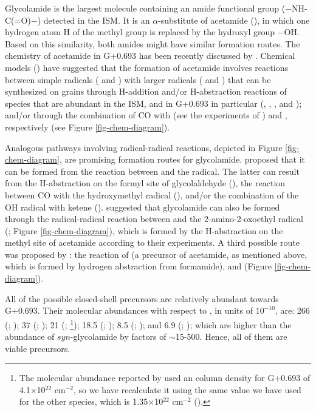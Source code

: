 \documentclass[twocolumn]{aastex63}
\begin{document}
Glycolamide is the largest molecule containing an amide functional group ($-$NH-C(=O)$-$) detected in the ISM. It is an $\alpha$-substitute of acetamide (), in which one hydrogen atom H of the methyl group is replaced by the hydroxyl group $-$OH. Based on this similarity, both amides might have similar formation routes. The chemistry of acetamide in G+0.693 has been recently discussed by \citet{zeng2023}. Chemical models (\citealt{belloche2017,belloche2019,garrod2022}) have suggested that the formation of acetamide involves reactions between simple radicals ( and ) with larger radicals ( and ) that can be synthesized on grains through H-addition and/or H-abstraction reactions of species that are abundant in the ISM, and in G+0.693 in particular (, , , and ); and/or through the combination of CO with  (see the experiments of \citealt{ligterink2018}) and , respectively (see Figure \ref{fig-chem-diagram}).

Analogous pathways involving radical-radical reactions, depicted in Figure \ref{fig-chem-diagram}, are promising formation routes for glycolamide. \citet{sanz-novo2020} proposed that it can be formed from the reaction between  and the  radical. The latter can result from the H-abstraction on the formyl site of glycolaldehyde (), the reaction between CO with the hydroxymethyl radical (), and/or the combination of the OH radical with ketene ().
\citet{haupa2020} suggested that glycolamide can also be formed through the radical-radical reaction between  and the 2-amino-2-oxoethyl radical (; Figure \ref{fig-chem-diagram}), which is formed by the H-abstraction on the methyl site of acetamide according to their experiments.
A third possible route was proposed by \citet{garrod_complex_2008}: the reaction of  (a precursor of acetamide, as mentioned above, which is formed by hydrogen
abstraction from formamide), and  (Figure \ref{fig-chem-diagram}). 
 
All of the possible closed-shell precursors are relatively abundant towards G+0.693. Their molecular abundances with respect to , in units of $10^{-10}$, are: 266 (; \citealt{zeng2018}); 37 (; \citealt{Sanz-Novo2022}); 21 (; \citealt{requena-torres_largest_2008}\footnote{The molecular abundance reported by \citet{requena-torres_largest_2008} used an  column density for G+0.693 of 4.1$\times$10$^{22}$ cm$^{-2}$, so we have recalculate it using the same value we have used for the other species, which is 1.35$\times$10$^{22}$ cm$^{-2}$ (\citealt{martin_tracing_2008}).}); 18.5 (; \citealt{zeng2023}); 8.5 (; \citealt{zeng2023}); and 6.9 (; \citealt{rivilla2022a}); which are higher than the abundance of $syn$-glycolamide by factors of $\sim$15-500. Hence, all of them are viable precursors. 
\end{document}
